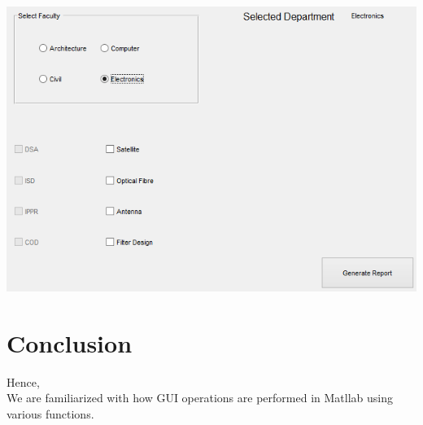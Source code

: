 \documentclass[12pt]{article}
\begin{document}
\includegraphics[scale = 0.6]{output_labfour_2.png}
\pagebreak
\section{Conclusion}
Hence, \\
We are familiarized with how GUI operations are performed in Matllab using various functions.
\end{document}
